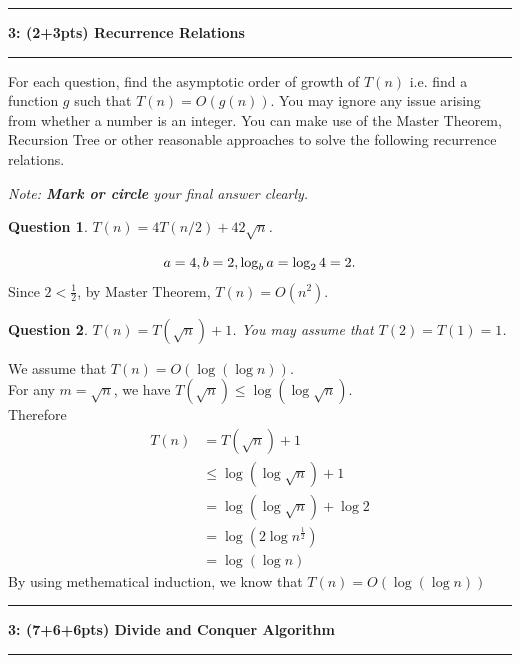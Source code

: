 \documentclass[10.5pt]{article}
\newcommand\question[2]{\vspace{.25in}\hrule\textbf{#1: #2}\vspace{.5em}\hrule\vspace{.10in}}
\newtheorem{Q}{Question}
\begin{document}
\newpage


\question{3}{(2+3pts) Recurrence Relations}
	For each question, find the asymptotic order of growth of $T(n)$ i.e. find a function $g$ such that $T(n) = O(g(n))$. You may ignore any issue arising from whether a number is an integer. You can make use of the Master Theorem, Recursion Tree or other reasonable approaches to solve the following recurrence relations.

	\textit{Note: \textbf{Mark or circle} your final answer clearly.\\ }

	\begin{Q} $T(n) = 4T(n/2) + 42\sqrt{n}$.
	\end{Q}
	$$
	a = 4, b= 2, \log_b a = \log_2 4 = 2.\\
	$$
	Since $2 < \frac12$, by Master Theorem, $T(n) = O(n^2)$.\\

	\begin{Q} $T(n) = T(\sqrt{n}) + 1$. You may assume that $T(2)=T(1)=1$.
	\end{Q}
	We assume that $T(n) = O(\log(\log n))$.\\
	For any $m = \sqrt n$, we have $T(\sqrt n) \le \log(\log\sqrt n)$.\\
	Therefore
	\begin{align*}
		T(n) &= T(\sqrt n) + 1\\
		&\le \log(\log\sqrt n) + 1\\
		& = \log(\log \sqrt n) + \log 2\\
		& = \log(2\log n^{\frac12})\\
		&= \log(\log n)
	\end{align*}
By using methematical induction, we know that $T(n) = O(\log(\log n))$


\newpage
\question{3}{(7+6+6pts) Divide and Conquer Algorithm}
\end{document}
